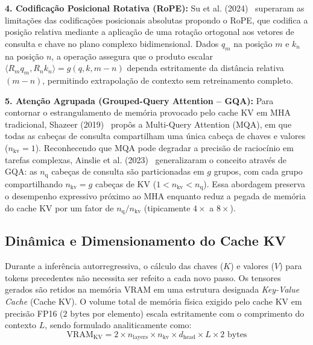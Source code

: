 \documentclass[10pt,a4paper,twocolumn]{article}
\begin{document}
\textbf{4. Codifica\c{c}\~ao Posicional Rotativa (RoPE):} Su et al. (2024)~\cite{su2024} superaram as limita\c{c}\~oes das codifica\c{c}\~oes posicionais absolutas propondo o RoPE, que codifica a posi\c{c}\~ao relativa mediante a aplica\c{c}\~ao de uma rota\c{c}\~ao ortogonal aos vetores de consulta e chave no plano complexo bidimensional. Dados $q_m$ na posi\c{c}\~ao $m$ e $k_n$ na posi\c{c}\~ao $n$, a opera\c{c}\~ao assegura que o produto escalar $\langle R_m q_m, R_n k_n \rangle = g(q, k, m-n)$ dependa estritamente da dist\^ancia relativa $(m - n)$, permitindo extrapola\c{c}\~ao de contexto sem retreinamento completo.

\textbf{5. Aten\c{c}\~ao Agrupada (Grouped-Query Attention -- GQA):} Para contornar o estrangulamento de mem\'oria provocado pelo cache KV em MHA tradicional, Shazeer (2019)~\cite{shazeer2019} prop\^os a Multi-Query Attention (MQA), em que todas as cabe\c{c}as de consulta compartilham uma \'unica cabe\c{c}a de chaves e valores ($n_{\text{kv}} = 1$). Reconhecendo que MQA pode degradar a precis\~ao de racioc\'inio em tarefas complexas, Ainslie et al. (2023)~\cite{ainslie2023} generalizaram o conceito atrav\'es de GQA: as $n_{\text{q}}$ cabe\c{c}as de consulta s\~ao particionadas em $g$ grupos, com cada grupo compartilhando $n_{\text{kv}} = g$ cabe\c{c}as de KV ($1 < n_{\text{kv}} < n_{\text{q}}$). Essa abordagem preserva o desempenho expressivo pr\'oximo ao MHA enquanto reduz a pegada de mem\'oria do cache KV por um fator de $n_{\text{q}} / n_{\text{kv}}$ (tipicamente $4\times$ a $8\times$).

\subsection{Din\^amica e Dimensionamento do Cache KV}

Durante a infer\^encia autorregressiva, o c\'alculo das chaves ($K$) e valores ($V$) para tokens precedentes n\~ao necessita ser refeito a cada novo passo. Os tensores gerados s\~ao retidos na mem\'oria VRAM em uma estrutura designada \emph{Key-Value Cache} (Cache KV). O volume total de mem\'oria f\'isica exigido pelo cache KV em precis\~ao FP16 ($2\text{ bytes}$ por elemento) escala estritamente com o comprimento do contexto $L$, sendo formulado analiticamente como:
\begin{equation}
\text{VRAM}_{\text{KV}} = 2 \times n_{\text{layers}} \times n_{\text{kv}} \times d_{\text{head}} \times L \times 2\text{ bytes}
\label{eq:kv_cache_formula}
\end{equation}
\end{document}
